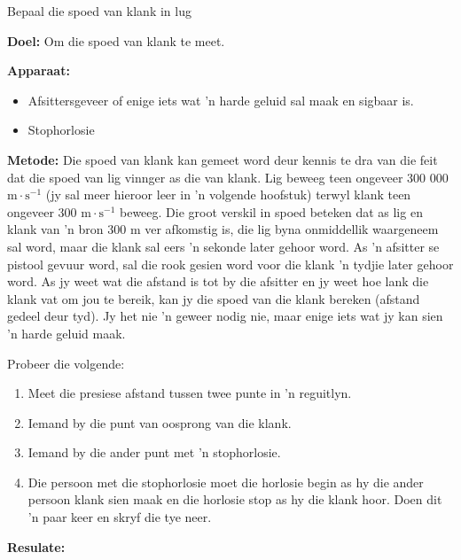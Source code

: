 \vspace*{-0.5cm}
\begin{i_experiment}{Bepaal die spoed van klank in lug}

\textbf{Doel:} Om die spoed van klank te meet.

\textbf{Apparaat:} 
\begin{itemize}
 \item Afsittersgeveer of enige iets wat 'n harde geluid sal maak en sigbaar is. 
  \item Stophorlosie
  \end{itemize}

\textbf{Metode:}
Die spoed van klank kan gemeet word deur kennis te dra van die feit dat die spoed van lig vinnger as die van klank. Lig beweeg teen ongeveer 300 000 $\text{m}\cdot\text{s}^{-1}$ (jy sal meer hieroor leer in 'n volgende hoofstuk) terwyl klank teen ongeveer 300 $\text{m}\cdot\text{s}^{-1}$ beweeg. Die groot verskil in spoed beteken dat as lig en klank van 'n bron 300 $\text{m}$ ver afkomstig is, die lig byna onmiddellik waargeneem sal word, maar die klank sal eers 'n sekonde later gehoor word. As 'n afsitter se pistool gevuur word, sal die rook gesien word voor die klank 'n tydjie later gehoor word. As jy weet wat die afstand is tot by die afsitter en jy weet hoe lank die klank vat om jou te bereik,  kan jy die spoed van die klank bereken (afstand gedeel deur tyd). Jy het nie 'n geweer nodig nie, maar enige iets wat jy kan sien 'n harde geluid maak.    


Probeer die volgende:
\begin{enumerate}[noitemsep, label=\textbf{\arabic*}. ] 
\item Meet die presiese afstand tussen twee punte in 'n reguitlyn.
\item Iemand by die punt van oosprong van die klank.
\item Iemand by die ander punt met 'n stophorlosie.
\item Die persoon met die stophorlosie moet die horlosie begin as hy die ander persoon klank sien maak en die horlosie stop as hy die klank hoor. Doen dit 'n paar keer en skryf die tye neer. 

\end{enumerate}

\textbf{Resulate:}


\end{i_experiment}
